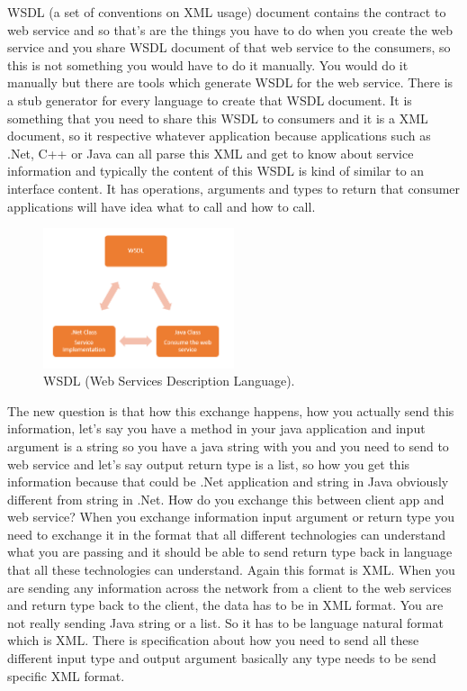 WSDL (a set of conventions on XML usage) document contains the contract to web service and so that’s are the things you have to do when you create the web service and you share WSDL document of that web service to the consumers, so this is not something you would have to do it manually. You would do it manually but there are tools which generate WSDL for the web service. There is a stub generator for every language to create that WSDL document. It is something that you need to share this WSDL to consumers and it is a XML document, so it respective whatever application because applications such as .Net, C++ or Java can all parse this XML\citep{thesis:state4} and get to know about service information and typically the content of this WSDL is kind of similar to an interface content. It has operations, arguments and types  to return that consumer applications will have idea what to call and how to call.

\begin{figure}[!htb]
  \centering
  \includegraphics[width=0.5\textwidth]{Figures/WSDL.png}
  \caption[WSDL (Web Services Description Language).]{WSDL (Web Services Description Language).}
  \label{fig:wsdl}
\end{figure}

The new question is that how this exchange happens, how you actually send this information, let’s say you have a method in your java application and input argument is a string so you have a java string with you and you need to send to web service and let’s say output return type is a list, so how you get this information because that could be .Net application and string in Java obviously different from string in .Net. How do you exchange this between client app and web service?  When you exchange information input argument or return type you need to exchange it in the format that all different technologies can understand what you are passing and it should be able to send return type back in language that all these technologies can understand. Again this format is XML. When you are sending any information across the network from a client to the web services and
return type back to the client, the data has to be in XML format. You are not really sending Java string or a list. So it has to be language natural format which is XML. There is specification about how you need to send all these different input type and output argument basically any type needs to be send specific XML format.

